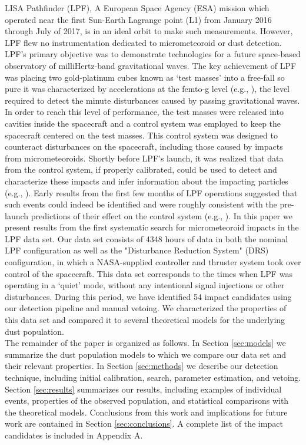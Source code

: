 \documentclass[preprint, trackchanges]{aastex61}
\newcommand{\nhits}{54 } %
\newcommand{\nhours}{4348 }
\begin{document}
LISA Pathfinder (LPF), A European Space Agency (ESA) mission which operated near the first Sun-Earth Lagrange point (L1) from January 2016 through July of 2017, is in an ideal orbit to make such measurements. However, LPF flew no instrumentation dedicated to micrometeoroid or dust detection.  LPF's primary objective was to demonstrate technologies for a future space-based observatory of milliHertz-band gravitational waves. The key achievement of LPF was placing two gold-platinum cubes known as `test masses' into a free-fall so pure it was characterized by accelerations at the femto-g level (e.g., \cite{LPF_PRL_2016, LPF_PRL_2018}), the level required to detect the minute disturbances caused by passing gravitational waves. In order to reach this level of performance, the test masses were released into cavities inside the spacecraft and a control system was employed to keep the spacecraft centered on the test masses.  This control system was designed to counteract disturbances on the spacecraft, including those caused by impacts from micrometeoroids. Shortly before LPF's launch, it was realized that data from the control system, if properly calibrated, could be used to detect and characterize these impacts and infer information about the impacting particles (e.g., \cite{Thorpe:2015cxa}). Early results from the first few months of LPF operations suggested that such events could indeed be identified and were roughly consistent with the pre-launch predictions of their effect on the control system (e.g., \cite{Thorpe2017a}). In this paper we present results from the first systematic search for micrometeoroid impacts in the LPF data set.  Our data set consists of \nhours hours of data in both the nominal LPF configuration as well as the "Disturbance Reduction System" (DRS) configuration, in which a NASA-supplied controller and thruster system took over control of the spacecraft. This data set corresponds to the times when LPF was operating in a `quiet' mode, without any intentional signal injections or other disturbances. During this period, we have identified \nhits impact candidates using our detection pipeline and manual vetoing. We characterized the properties of this data set and compared it to several theoretical models for the underlying dust population. 
\\
The remainder of the paper is organized as follows. In Section \ref{sec:models} we summarize the dust population models to which we compare our data set and their relevant properties. In Section \ref{sec:methods} we describe our detection technique, including initial calibration, search, parameter estimation, and vetoing. Section \ref{sec:results} summarizes our results, including examples of individual events, properties of the observed population, and statistical comparisons with the theoretical models. Conclusions from this work and implications for future work are contained in Section \ref{sec:conclusions}. A complete list of the impact candidates is included in Appendix A. 
\end{document}
